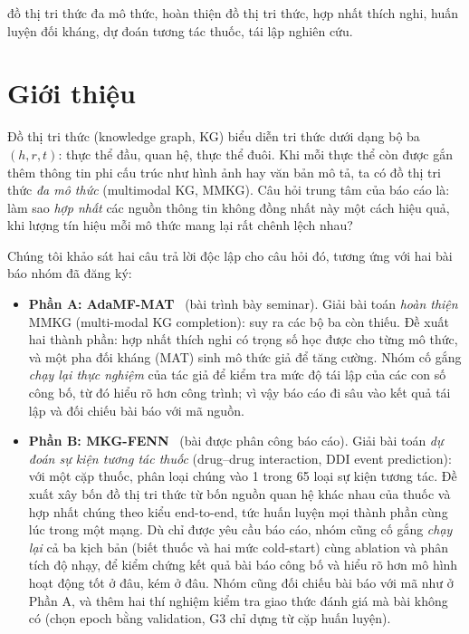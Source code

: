 \documentclass[conference]{IEEEtran}
\begin{document}
\begin{IEEEkeywords}
đồ thị tri thức đa mô thức, hoàn thiện đồ thị tri thức, hợp nhất thích nghi, huấn
luyện đối kháng, dự đoán tương tác thuốc, tái lập nghiên cứu.
\end{IEEEkeywords}

\section{Giới thiệu}

Đồ thị tri thức (knowledge graph, KG) biểu diễn tri thức dưới dạng bộ ba
$(h, r, t)$: thực thể đầu, quan hệ, thực thể đuôi. Khi mỗi thực thể còn được
gắn thêm thông tin phi cấu trúc như hình ảnh hay văn bản mô tả, ta có đồ thị tri
thức \emph{đa mô thức} (multimodal KG, MMKG). Câu hỏi trung tâm của báo cáo là:
làm sao \emph{hợp nhất} các nguồn thông tin không đồng nhất này một cách hiệu quả,
khi lượng tín hiệu mỗi mô thức mang lại rất chênh lệch nhau?

Chúng tôi khảo sát hai câu trả lời độc lập cho câu hỏi đó, tương ứng với hai bài
báo nhóm đã đăng ký:

\begin{itemize}
  \item \textbf{Phần A: AdaMF-MAT}~\cite{adamfmat} (bài trình bày seminar). Giải
  bài toán \emph{hoàn thiện} MMKG (multi-modal KG completion): suy ra các bộ ba
  còn thiếu. Đề xuất hai thành phần: hợp nhất thích nghi có trọng số học được
  cho từng mô thức, và một pha đối kháng (MAT) sinh mô thức giả để tăng cường.
  Nhóm cố gắng \emph{chạy lại thực nghiệm} của tác giả để kiểm tra mức độ tái lập
  của các con số công bố, từ đó hiểu rõ hơn công trình; vì vậy báo cáo đi sâu vào kết
  quả tái lập và đối chiếu bài báo với mã nguồn.

  \item \textbf{Phần B: MKG-FENN}~\cite{mkgfenn} (bài được phân công báo cáo). Giải
  bài toán \emph{dự đoán sự kiện tương tác thuốc} (drug--drug interaction, DDI
  event prediction): với một cặp thuốc, phân loại chúng vào 1 trong 65 loại sự
  kiện tương tác. Đề xuất xây bốn đồ thị tri thức từ bốn nguồn quan hệ khác nhau
  của thuốc và hợp nhất chúng theo kiểu end-to-end, tức huấn luyện mọi thành phần cùng lúc trong một mạng. Dù chỉ được yêu cầu báo cáo,
  nhóm cũng cố gắng \emph{chạy lại} cả ba kịch bản (biết thuốc và hai mức cold-start)
  cùng ablation và phân tích độ nhạy, để kiểm chứng kết quả bài báo công bố và hiểu
  rõ hơn mô hình hoạt động tốt ở đâu, kém ở đâu. Nhóm cũng đối chiếu bài báo với mã như ở Phần A,
  và thêm hai thí nghiệm kiểm tra giao thức đánh giá mà bài không có (chọn epoch bằng validation, G3
  chỉ dựng từ cặp huấn luyện).
\end{itemize}
\end{document}
